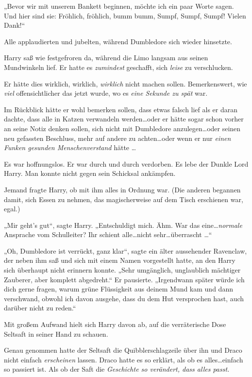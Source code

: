 {„Bevor wir mit unserem Bankett beginnen, möchte ich ein paar Worte sagen. Und hier sind sie: Fröhlich, fröhlich, bumm bumm, Sumpf, Sumpf, Sumpf! Vielen Dank!“

Alle applaudierten und jubelten, während Dumbledore sich wieder hinsetzte.

Harry saß wie festgefroren da, während die Limo langsam aus seinen Mundwinkeln lief. Er hatte es \emph{zumindest} geschafft, sich \emph{leise} zu verschlucken.

Er hätte dies wirklich, wirklich, \emph{wirklich} nicht machen sollen. Bemerkenswert, wie \emph{viel} offensichtlicher das jetzt wurde, wo es \emph{eine Sekunde zu spät} war.

Im Rückblick hätte er wohl bemerken sollen, dass etwas falsch lief als er daran dachte, dass alle in Katzen verwandeln werden…oder er hätte sogar schon vorher an seine Notiz denken sollen, sich nicht mit Dumbledore anzulegen…oder seinen neu gefassten Beschluss, mehr auf andere zu achten…oder wenn er nur \emph{einen Funken gesunden Menschenverstand} hätte …

Es war hoffnungslos. Er war durch und durch verdorben. Es lebe der Dunkle Lord Harry. Man konnte nicht gegen sein Schicksal ankämpfen.

Jemand fragte Harry, ob mit ihm alles in Ordnung war. (Die anderen begannen damit, sich Essen zu nehmen, das magischerweise auf dem Tisch erschienen war, egal.)

„Mir geht's gut“, sagte Harry. „Entschuldigt mich. Ähm. War das eine…\emph{normale} Ansprache vom Schulleiter? Ihr schient alle…nicht sehr…überrascht …“

„Oh, Dumbledore ist verrückt, ganz klar“, sagte ein älter aussehender Ravenclaw, der neben ihm saß und sich mit einem Namen vorgestellt hatte, an den Harry sich überhaupt nicht erinnern konnte. „Sehr umgänglich, unglaublich mächtiger Zauberer, aber komplett abgedreht.“ Er pausierte. „Irgendwann später würde ich dich gerne fragen, warum grüne Flüssigkeit aus deinem Mund kam und dann verschwand, obwohl ich davon ausgehe, dass du dem Hut versprochen hast, auch darüber nicht zu reden.“

Mit großem Aufwand hielt sich Harry davon ab, auf die verräterische Dose Seltsaft in seiner Hand zu schauen.

Genau genommen hatte der Seltsaft die Quibblerschlagzeile über ihn und Draco nicht einfach \emph{erscheinen} lassen. Draco hatte es so erklärt, als ob es alles…einfach so passiert ist. Als ob der Saft die \emph{Geschichte so verändert, dass alles passt.}

}
